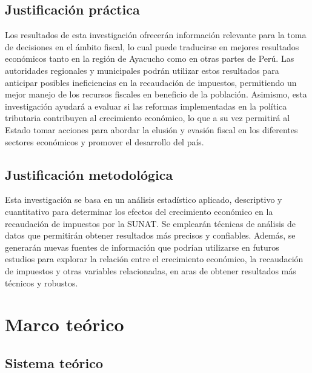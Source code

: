 \documentclass[
  letterpaper,
  DIV=11,
  numbers=noendperiod]{scrartcl}
\begin{document}
\hypertarget{sec-justificaciuxf3n-pruxe1ctica}{%
\subsection{Justificación
práctica}\label{sec-justificaciuxf3n-pruxe1ctica}}

Los resultados de esta investigación ofrecerán información relevante
para la toma de decisiones en el ámbito fiscal, lo cual puede traducirse
en mejores resultados económicos tanto en la región de Ayacucho como en
otras partes de Perú. Las autoridades regionales y municipales podrán
utilizar estos resultados para anticipar posibles ineficiencias en la
recaudación de impuestos, permitiendo un mejor manejo de los recursos
fiscales en beneficio de la población. Asimismo, esta investigación
ayudará a evaluar si las reformas implementadas en la política
tributaria contribuyen al crecimiento económico, lo que a su vez
permitirá al Estado tomar acciones para abordar la elusión y evasión
fiscal en los diferentes sectores económicos y promover el desarrollo
del país.

\hypertarget{sec-justificaciuxf3n-metodoluxf3gica}{%
\subsection{Justificación
metodológica}\label{sec-justificaciuxf3n-metodoluxf3gica}}

Esta investigación se basa en un análisis estadístico aplicado,
descriptivo y cuantitativo para determinar los efectos del crecimiento
económico en la recaudación de impuestos por la SUNAT. Se emplearán
técnicas de análisis de datos que permitirán obtener resultados más
precisos y confiables. Además, se generarán nuevas fuentes de
información que podrían utilizarse en futuros estudios para explorar la
relación entre el crecimiento económico, la recaudación de impuestos y
otras variables relacionadas, en aras de obtener resultados más técnicos
y robustos.

\hypertarget{sec-marco-teuxf3rico}{%
\section{Marco teórico}\label{sec-marco-teuxf3rico}}

\hypertarget{sec-sistema-teuxf3rico}{%
\subsection{Sistema teórico}\label{sec-sistema-teuxf3rico}}
\end{document}
